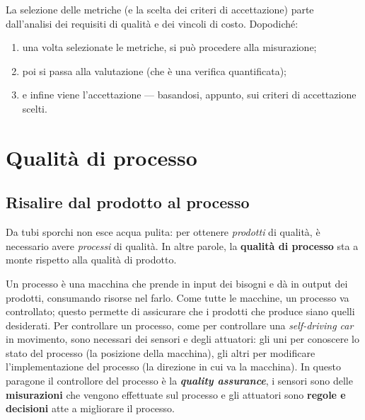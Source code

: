 \documentclass[a4paper]{article}
\begin{document}
		
La selezione delle metriche (e la scelta dei criteri di accettazione) parte dall'analisi dei requisiti di qualità e dei vincoli di costo. Dopodiché:
		
	\begin{enumerate}
		
			
	\item una volta selezionate le metriche, si può procedere alla misurazione;
			
	\item poi si passa alla valutazione (che è una verifica quantificata);
			
	\item e infine viene l'accettazione — basandosi, appunto, sui criteri di accettazione scelti.
		
	\end{enumerate}

	


		
	\section{Qualità di processo}


		
	\subsection{Risalire dal prodotto al processo}

		
Da tubi sporchi non esce acqua pulita: per ottenere \emph{prodotti} di qualità, è necessario avere \emph{processi} di qualità. In altre parole, la \textbf{qualità di processo} sta a monte rispetto alla qualità di prodotto.
		
Un processo è una macchina che prende in input dei bisogni e dà in output dei prodotti, consumando risorse nel farlo. Come tutte le macchine, un processo va controllato; questo permette di assicurare che i prodotti che produce siano quelli desiderati. Per controllare un processo, come per controllare una \emph{self-driving car} in movimento, sono necessari dei sensori e degli attuatori: gli uni per conoscere lo stato del processo (la posizione della macchina), gli altri per modificare l'implementazione del processo (la direzione in cui va la macchina). In questo paragone il controllore del processo è la \textbf{\emph{quality assurance}}, i sensori sono delle \textbf{misurazioni} che vengono effettuate sul processo e gli attuatori sono \textbf{regole e decisioni} atte a migliorare il processo.
		
\end{document}
